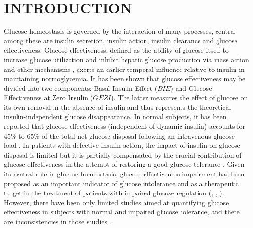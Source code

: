 \documentclass[utf8]{frontiersSCNS} %
\begin{document}
\section{INTRODUCTION} %
Glucose homeostasis is governed by the interaction of many processes, central among these are insulin secretion, insulin action, insulin clearance and glucose effectiveness. Glucose effectiveness, defined as the ability of glucose itself to increase glucose utilization and inhibit hepatic glucose production via mass action and other mechanisms \citep{Dube2015}, exerts an earlier temporal influence relative to insulin in maintaining normoglycemia. It has been shown \citep{Kahn_1990} that glucose effectiveness may be divided into two components: Basal Insulin Effect ($BIE$) and Glucose Effectiveness at Zero Insulin ($GEZI$). The latter measures the effect of glucose on its own removal in the absence of insulin and thus represents the theoretical insulin-independent glucose disappearance. In normal subjects, it has been reported that glucose effectiveness (independent of dynamic insulin) accounts for 45\% to 65\% of the total net glucose disposal following an intravenous glucose load \citep{Alford_2018}. In patients with defective insulin action, the impact of insulin on glucose disposal is limited but it is partially compensated by the crucial contribution of glucose effectiveness in the attempt of restoring a good glucose tolerance \citep{Dube2015}. Given its central role in glucose homeostasis, glucose effectiveness impairment has been proposed as an important indicator of glucose intolerance and as a therapeutic target in the treatment of patients with impaired glucose regulation (\citet{basu_2009}, \citet{pau_2014}, \citet{Alford_2018}). However, there have been only limited studies aimed at quantifying glucose effectiveness in subjects with normal and impaired glucose tolerance, and there are inconsistencies in those studies \citep{Dube2015}.
\end{document}
